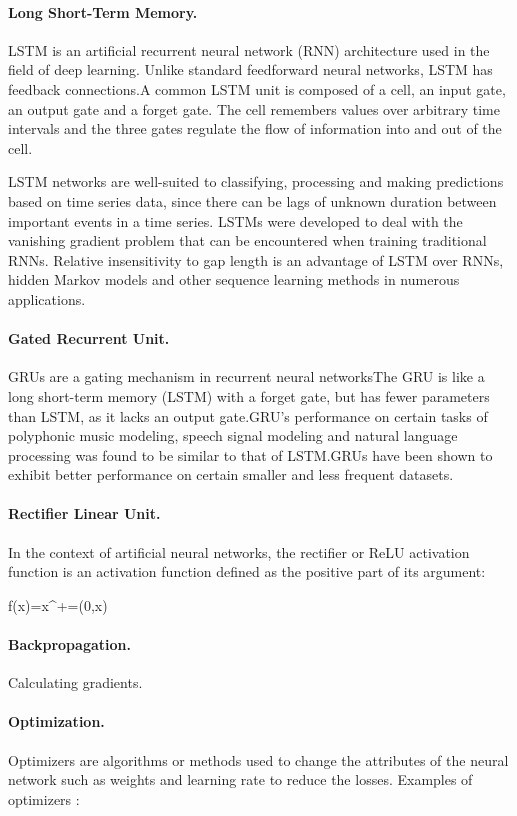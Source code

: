 \documentclass{article}
\begin{document}
\paragraph*{Long Short-Term Memory.}
LSTM is an artificial recurrent neural network (RNN) architecture used in the field of deep learning. Unlike standard feedforward neural networks, LSTM has feedback connections.A common LSTM unit is composed of a cell, an input gate, an output gate and a forget gate. The cell remembers values over arbitrary time intervals and the three gates regulate the flow of information into and out of the cell.

LSTM networks are well-suited to classifying, processing and making predictions based on time series data, since there can be lags of unknown duration between important events in a time series. LSTMs were developed to deal with the vanishing gradient problem that can be encountered when training traditional RNNs. Relative insensitivity to gap length is an advantage of LSTM over RNNs, hidden Markov models and other sequence learning methods in numerous applications.

\paragraph*{Gated Recurrent Unit.}
GRUs are a gating mechanism in recurrent neural networksThe GRU is like a long short-term memory (LSTM) with a forget gate, but has fewer parameters than LSTM, as it lacks an output gate.GRU's performance on certain tasks of polyphonic music modeling, speech signal modeling and natural language processing was found to be similar to that of LSTM.GRUs have been shown to exhibit better performance on certain smaller and less frequent datasets.

\paragraph*{Rectifier Linear Unit.}
In the context of artificial neural networks, the rectifier or ReLU activation function is an activation function defined as the positive part of its argument:

{\displaystyle f(x)=x^{+}=\max(0,x)}


\paragraph*{Backpropagation.}
Calculating gradients.

\paragraph*{Optimization.}
Optimizers are algorithms or methods used to change the attributes of the neural network such as weights and learning rate to reduce the losses. Examples of optimizers :
\end{document}
